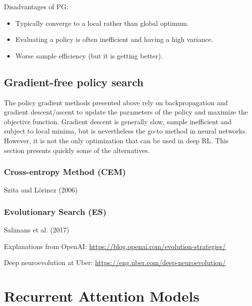 \documentclass[
  letterpaper,
  DIV=11,
  numbers=noendperiod]{scrreprt}
\providecommand{\tightlist}{%
  \setlength{\itemsep}{0pt}\setlength{\parskip}{0pt}}\usepackage{longtable,booktabs,array}
\begin{document}
Disadvantages of PG:

\begin{itemize}
\tightlist
\item
  Typically converge to a local rather than global optimum.
\item
  Evaluating a policy is often inefficient and having a high variance.
\item
  Worse sample efficiency (but it is getting better).
\end{itemize}

\hypertarget{gradient-free-policy-search}{%
\section{Gradient-free policy
search}\label{gradient-free-policy-search}}

The policy gradient methods presented above rely on backpropagation and
gradient descent/ascent to update the parameters of the policy and
maximize the objective function. Gradient descent is generally slow,
sample inefficient and subject to local minima, but is nevertheless the
go-to method in neural networks. However, it is not the only
optimization that can be used in deep RL. This section presents quickly
some of the alternatives.

\hypertarget{cross-entropy-method-cem}{%
\subsection{Cross-entropy Method (CEM)}\label{cross-entropy-method-cem}}

Szita and Lörincz (2006)

\hypertarget{evolutionary-search-es}{%
\subsection{Evolutionary Search (ES)}\label{evolutionary-search-es}}

Salimans et al. (2017)

Explanations from OpenAI:
\url{https://blog.openai.com/evolution-strategies/}

Deep neuroevolution at Uber:
\url{https://eng.uber.com/deep-neuroevolution/}


\hypertarget{recurrent-attention-models}{%
\chapter{Recurrent Attention Models}\label{recurrent-attention-models}}
\end{document}
